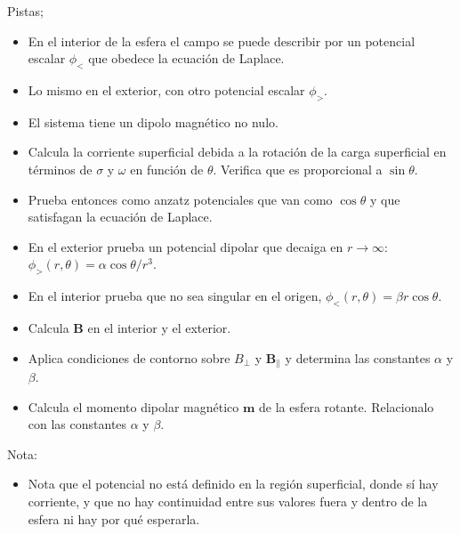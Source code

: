 \documentclass{exam}
\begin{document}
\begin{questions}
  Pistas;
  \begin{itemize}
  \item En el interior de la esfera el campo se puede describir por un
    potencial escalar $\phi_<$ que obedece la ecuación de Laplace.
  \item Lo mismo en el exterior, con otro potencial escalar $\phi_>$.
  \item El sistema tiene un dipolo magnético no nulo.
  \item Calcula la corriente superficial debida a la rotación de la
    carga superficial en términos de $\sigma$ y $\omega$ en función de
    $\theta$. Verifica que es proporcional a $\sin\theta$.
  \item Prueba entonces como anzatz potenciales que van como
    $\cos\theta$ y que satisfagan la ecuación de Laplace.
  \item En el exterior prueba un potencial dipolar que decaiga en
    $r\to\infty$: $\phi_>(r,\theta)=\alpha\cos\theta/r^3$.
  \item En el interior prueba que no sea singular en el origen,
    $\phi_<(r,\theta)=\beta r\cos\theta$.
  \item Calcula $\bm B$ en el interior y el exterior.
  \item Aplica condiciones de contorno sobre $B_\perp$ y $\bm
    B_\parallel$ y determina las constantes $\alpha$ y $\beta$.
  \item Calcula el momento dipolar magnético $\bm m$ de la esfera
    rotante. Relacionalo con las constantes $\alpha$ y $\beta$.
  \end{itemize}
  Nota:
  \begin{itemize}
  \item Nota que el potencial no está definido en la región
    superficial, donde sí hay corriente, y que no hay continuidad
    entre sus valores fuera y dentro de la esfera ni hay por qué esperarla.
  \end{itemize}



\end{questions}
\end{document}
